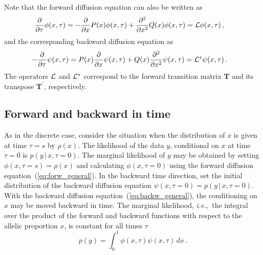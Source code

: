 \documentclass[preprint]{elsarticle}
\newcommand\given{{\,|\,}}
\newcommand\ie{{\it i.e.,}}
\newcommand\s{\ensuremath{s}}
\begin{document}
Note that the forward diffusion equation can also be written as
\begin{equation}\label{eq:forw_general}
\begin{split}
\frac{\partial}{\partial \tau}\phi(x,\tau)&=-\frac{\partial}{\partial x} P(x)\phi(x,\tau)+\frac{\partial^2}{\partial x^2} Q(x) \phi(x,\tau) = {\cal L} \phi(x, \tau)\,,
\end{split}
\end{equation}
and the corresponding backward diffusion equation as
\begin{equation}\label{eq:backw_general}
\begin{split}
-\frac{\partial}{\partial \tau}\psi(x,\tau)&=P(x)\frac{\partial}{\partial x} \psi(x,\tau)+Q(x)\frac{\partial^2}{\partial x^2} \psi(x,\tau) = {\cal L}^{*} \psi(x, \tau)\,.
\end{split}
\end{equation}
The operators ${\cal L}$ and ${\cal L}^{*}$ correspond to the forward transition matrix $\mathbf{T}$ and its transpose $\mathbf{T}^{'}$, respectively.

\subsection{Forward and backward in time}

As in the discrete case, consider the situation when the distribution of $x$ is given at time $\tau=\s$ by $\rho(x)$. The likelihood of the data $y$, conditional on $x$ at time $\tau=0$ is $p(y\given x,\tau=0)$. The marginal likelihood of $y$ may be obtained by setting $\phi(x,\tau=\s)=\rho(x)$ and calculating $\phi(x,\tau=0)$ using the forward diffusion equation~(\ref{eq:forw_general}). In the backward time direction, set the initial distribution of the backward diffusion equation  $\psi(x,\tau=0)=p(y\given x,\tau=0)$. With the backward diffusion equation~(\ref{eq:backw_general}), the conditioning on $x$ may be moved backward in time. The marginal likelihood, \ie\ the integral over the product of the forward and backward functions with respect to the allelic proportion $x$, is constant for all times $\tau$ 
\begin{equation}\label{eq:marg_like}
p(y) = \int_{0}^{1} \phi(x,\tau)\psi(x,\tau)  \,dx\,.
\end{equation}
\end{document}
